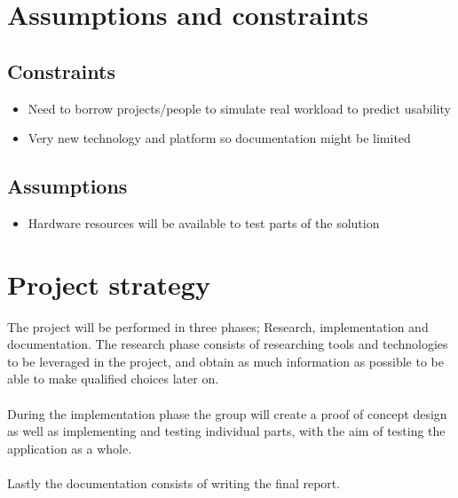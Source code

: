 \documentclass[../main.tex]{subfiles}
\begin{document}
\section{Assumptions and constraints}
\subsection*{Constraints}
\begin{itemize}
    \item Need to borrow projects/people to simulate real workload to predict usability
    \item Very new technology and platform so documentation might be limited
\end{itemize}
\subsection*{Assumptions}
\begin{itemize}
    \item Hardware resources will be available to test parts of the solution
\end{itemize}

\section{Project strategy}
The project will be performed in three phases; Research, implementation and documentation. The research phase consists of researching tools and technologies to be leveraged in the project, and obtain as much information as possible to be able to make qualified choices later on.\\\\
During the implementation phase the group will create a proof of concept design as well as implementing and testing individual parts, with the aim of testing the application as a whole.\\\\
Lastly the documentation consists of writing the final report.
\end{document}
